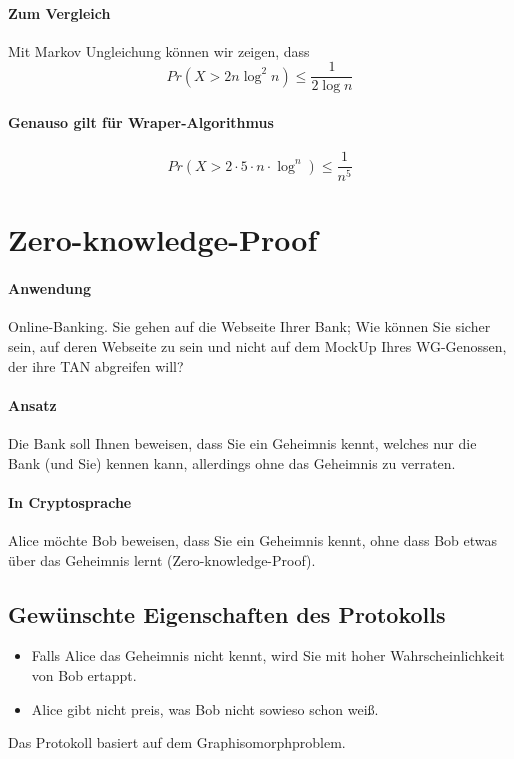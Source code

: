 \paragraph*{Zum Vergleich} Mit Markov Ungleichung können wir zeigen, dass $$ Pr(X > 2n \log^2 n) \leq \frac{1}{2 \log n} $$

\paragraph*{Genauso gilt für Wraper-Algorithmus} $$ Pr(X > 2 \cdot 5 \cdot n \cdot \log^n) \leq \frac{1}{n^5} $$


\section{Zero-knowledge-Proof}
\paragraph*{Anwendung} Online-Banking. Sie gehen auf die Webseite Ihrer Bank; Wie können Sie sicher sein, auf deren Webseite zu sein und nicht auf dem MockUp Ihres WG-Genossen, der ihre TAN abgreifen will?

\paragraph*{Ansatz} Die Bank soll Ihnen beweisen, dass Sie ein Geheimnis kennt, welches nur die Bank (und Sie) kennen kann, allerdings ohne das Geheimnis zu verraten.

\paragraph*{In Cryptosprache} Alice möchte Bob beweisen, dass Sie ein Geheimnis kennt, ohne dass Bob etwas über das Geheimnis lernt (Zero-knowledge-Proof).

\subsection{Gewünschte Eigenschaften des Protokolls}
\begin{itemize}
	\item Falls Alice das Geheimnis nicht kennt, wird Sie mit hoher Wahrscheinlichkeit von Bob ertappt.
	\item Alice gibt nicht preis, was Bob nicht sowieso schon weiß.
\end{itemize}
Das Protokoll basiert auf dem Graphisomorphproblem.

